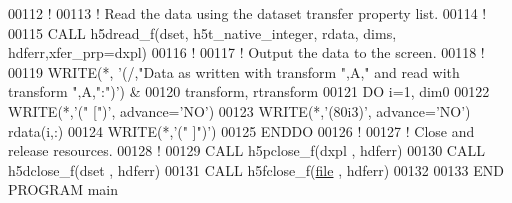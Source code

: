 \begin{DoxyCode}
00112   \textcolor{comment}{!}
00113   \textcolor{comment}{! Read the data using the dataset transfer property list.}
00114   \textcolor{comment}{!}
00115   \textcolor{keyword}{CALL }h5dread\_f(dset, h5t\_native\_integer, rdata, dims, hdferr,xfer\_prp=dxpl)
00116   \textcolor{comment}{!}
00117   \textcolor{comment}{! Output the data to the screen.}
00118   \textcolor{comment}{!}
00119   \textcolor{keyword}{WRITE}(*, \textcolor{stringliteral}{'(/,"Data as written with transform ",A," and read with transform ",A,":")'}) &
00120        transform, rtransform
00121   \textcolor{keywordflow}{DO} i=1, dim0
00122      \textcolor{keyword}{WRITE}(*,\textcolor{stringliteral}{'(" [")'}, advance=\textcolor{stringliteral}{'NO'})
00123      \textcolor{keyword}{WRITE}(*,\textcolor{stringliteral}{'(80i3)'}, advance=\textcolor{stringliteral}{'NO'}) rdata(i,:)
00124      \textcolor{keyword}{WRITE}(*,\textcolor{stringliteral}{'(" ]")'})
00125 \textcolor{keywordflow}{  ENDDO}
00126   \textcolor{comment}{!}
00127   \textcolor{comment}{! Close and release resources.}
00128   \textcolor{comment}{!}
00129   \textcolor{keyword}{CALL }h5pclose\_f(dxpl , hdferr)
00130   \textcolor{keyword}{CALL }h5dclose\_f(dset , hdferr)
00131   \textcolor{keyword}{CALL }h5fclose\_f(\hyperlink{structfile}{file} , hdferr)
00132 
00133 \textcolor{keyword}{END PROGRAM }main
\end{DoxyCode}
